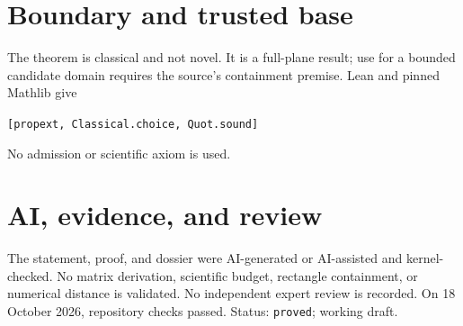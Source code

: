 \documentclass[11pt]{article}
\begin{document}
\section{Boundary and trusted base}
The theorem is classical and not novel. It is a full-plane result; use for a bounded
candidate domain requires the source's containment premise. Lean and pinned Mathlib give
\begin{center}\texttt{[propext, Classical.choice, Quot.sound]}\end{center}
No admission or scientific axiom is used.

\section{AI, evidence, and review}
The statement, proof, and dossier were AI-generated or AI-assisted and kernel-checked.
No matrix derivation, scientific budget, rectangle containment, or numerical distance is
validated. No independent expert review is recorded. On 18 October 2026, repository
checks passed. Status: \texttt{proved}; working draft.
\end{document}
